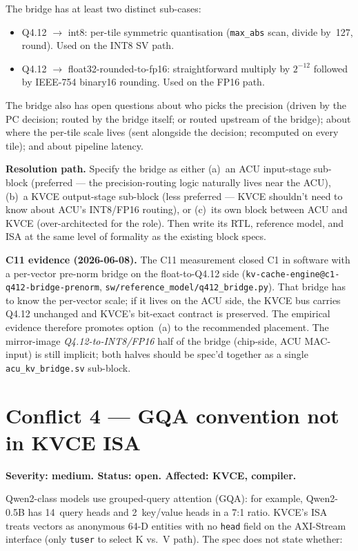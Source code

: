 \documentclass[11pt]{article}
\begin{document}
The bridge has at least two distinct sub-cases:

\begin{itemize}
\item Q4.12 $\rightarrow$ int8: per-tile symmetric quantisation
(\texttt{max\_abs} scan, divide by~127, round). Used on the INT8
SV path.
\item Q4.12 $\rightarrow$ float32-rounded-to-fp16: straightforward
multiply by $2^{-12}$ followed by IEEE-754 binary16 rounding. Used
on the FP16 path.
\end{itemize}

The bridge also has open questions about who picks the precision
(driven by the PC decision; routed by the bridge itself; or routed
upstream of the bridge); about where the per-tile scale lives (sent
alongside the decision; recomputed on every tile); and about
pipeline latency.

\textbf{Resolution path.} Specify the bridge as either (a)~an ACU
input-stage sub-block (preferred --- the precision-routing logic
naturally lives near the ACU), (b)~a KVCE output-stage sub-block
(less preferred --- KVCE shouldn't need to know about ACU's
INT8/FP16 routing), or (c)~its own block between ACU and KVCE
(over-architected for the role). Then write its RTL, reference
model, and ISA at the same level of formality as the existing block
specs.

\textbf{C11 evidence (2026-06-08).} The C11 measurement closed C1
in software with a per-vector pre-norm bridge on the float-to-Q4.12
side (\texttt{kv-cache-engine@c1-q412-bridge-prenorm},
\texttt{sw/reference\_model/q412\_bridge.py}). That bridge has to
know the per-vector scale; if it lives on the ACU side, the KVCE bus
carries Q4.12 unchanged and KVCE's bit-exact contract is preserved.
The empirical evidence therefore promotes option~(a) to the
recommended placement. The mirror-image \emph{Q4.12-to-INT8/FP16}
half of the bridge (chip-side, ACU MAC-input) is still implicit;
both halves should be spec'd together as a single
\texttt{acu\_kv\_bridge.sv} sub-block.

\section{Conflict 4 --- GQA convention not in KVCE ISA}
\label{sec:c4}

\textbf{Severity: medium. Status: open. Affected: KVCE, compiler.}

Qwen2-class models use grouped-query attention (GQA): for example,
Qwen2-0.5B has 14~query heads and 2~key/value heads in a 7:1 ratio.
KVCE's ISA treats vectors as anonymous 64-D entities with no
\texttt{head} field on the AXI-Stream interface (only \texttt{tuser}
to select K vs.\ V path). The spec does not state whether:
\end{document}
